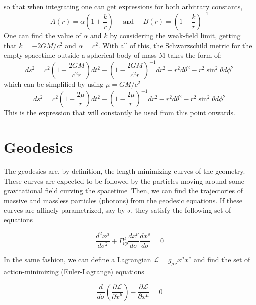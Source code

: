 \documentclass[letterpaper,11pt,onecolumn]{article}
\begin{document}
so that when integrating one can get expressions for both arbitrary constants,
\begin{equation}
A(r)=\alpha\left(1+\frac{k}{r}\right) \quad \text { and } \quad B(r)=\left(1+\frac{k}{r}\right)^{-1} \nonumber
\end{equation}
One can find the value of $\alpha$ and $k$ by considering the weak-field limit, getting that $k=-2 G M / c^{2}$ and $\alpha=c^{2}$. With all of this, the Schwarzschild metric for the empty spacetime outside a spherical body of mass M takes the form of: 
\begin{equation}
d s^{2}=c^{2}\left(1-\frac{2 G M}{c^{2} r}\right) d t^{2}-\left(1-\frac{2 G M}{c^{2} r}\right)^{-1} d r^{2}-r^{2} d \theta^{2}-r^{2} \sin ^{2} \theta d \phi^{2}\nonumber
\end{equation}
which can be simplified by using $\mu=GM/c^2$
\begin{equation}
d s^{2}=c^{2}\left(1-\frac{2 \mu}{r}\right) d t^{2}-\left(1-\frac{2 \mu}{r}\right)^{-1} d r^{2}-r^{2} d \theta^{2}-r^{2} \sin ^{2} \theta d \phi^{2}
\label{metric}
\end{equation}
This is the expression that will constantly be used from this point onwards.

\section{Geodesics}


The geodesics are, by definition, the length-minimizing curves of the geometry. These curves are expected to be followed by the particles moving around some gravitational field curving the spacetime. Then, we can find the trajectories of massive and massless particles (photons) from the geodesic equations. If these curves are affinely parametrized, say by $\sigma$, they satisfy the following set of equations

\begin{equation}
    \frac{d^2 x^\mu}{d\sigma^2} + \Gamma^{\mu}_{\nu \rho} \frac{dx^\nu}{d\sigma} \frac{dx^\rho}{d\sigma} = 0
\end{equation}

In the same fashion, we can define a Lagrangian $\mathcal{L} = g_{\mu \nu}  \dot{x}^\mu \dot{x}^\nu$ and find the set of action-minimizing (Euler-Lagrange) equations

\begin{equation}\label{Euler-Lagrange}
\frac{d}{d\sigma} \left( \frac{\partial \mathcal{L}}{\partial \dot{x}^\mu}\right) - \frac{\partial \mathcal{L}}{\partial x^\mu} = 0
\end{equation}
\end{document}
